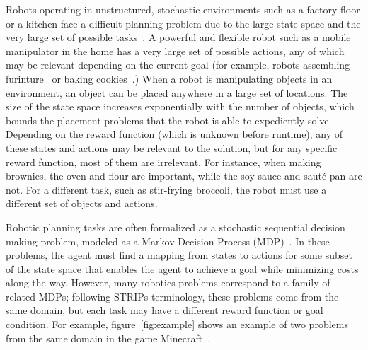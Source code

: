 \documentclass[letterpaper]{article}
\begin{document}
Robots operating in unstructured, stochastic environments such as a
factory floor or a kitchen face a difficult planning problem due to
the large state space and the very large set of possible
tasks~\citep{bollini12,knepper13}.  A powerful and flexible robot such
as a mobile manipulator in the home has a very large set of possible
actions, any of which may be relevant depending on the current goal
(for example, robots assembling furinture~\citep{knepper13} or baking
cookies~\citep{bollini12}.)  When a robot is manipulating objects in
an environment, an object can be placed anywhere in a large set of
locations.  The size of the state space increases exponentially with
the number of objects, which bounds the placement problems that the
robot is able to expediently solve.  Depending on the reward function
(which is unknown before runtime), any of these states and actions may
be relevant to the solution, but for any specific reward function,
most of them are irrelevant.  For instance, when making brownies, the
oven and flour are important, while the soy sauce and saut\'{e} pan
are not.  For a different task, such as stir-frying broccoli, the
robot must use a different set of objects and
actions. 

Robotic planning tasks are often formalized as a stochastic sequential
decision making problem, modeled as a Markov Decision Process
(MDP)~\citep{thrun2008probabilistic}. In these problems, the agent
must find a mapping from states to actions for some subset of the
state space that enables the agent to achieve a goal while minimizing
costs along the way.  However, many robotics problems correspond to a
family of related MDPs; following STRIPs terminology, these problems
come from the same domain, but each task may have a different reward
function or goal condition.  For example, figure~\ref{fig:example}
shows an example of two problems from the same domain in the game
Minecraft~\citep{minecraft}.



\end{document}
